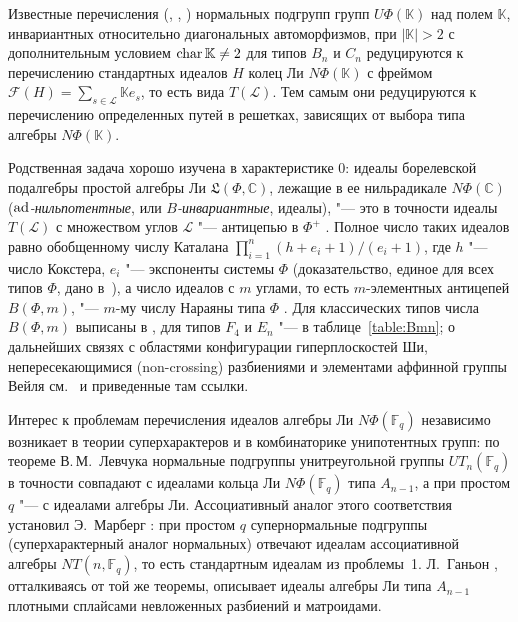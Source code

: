 \documentclass[a4paper,14pt,oneside,openany]{memoir}
\begin{document}
Известные перечисления (\cite[следствие 4.3]{vL74}, \cite[теорема
2.1.2]{Egorychev77}, \cite{Eg-Lev-1996}) нормальных подгрупп групп
$U\Phi(\mathbb{K})$ над полем $\mathbb{K}$, инвариантных относительно
диагональных автоморфизмов, при $|\mathbb{K}|>2$ с дополнительным условием
$\operatorname{char}\mathbb{K}\neq2$ для типов $B_n$ и $C_n$ редуцируются к перечислению
стандартных идеалов $H$ колец Ли $N\Phi(\mathbb{K})$ с фреймом $\mathcal{F}(H)
= \sum_{s\in \mathcal{L}} \mathbb{K}e_{s}$, то есть вида $T(\mathcal{L})$. Тем
самым они редуцируются к перечислению определенных путей в решетках, зависящих
от выбора типа алгебры $N\Phi(\mathbb{K})$.

Родственная задача хорошо изучена в характеристике $0$: идеалы борелевской
подалгебры простой алгебры Ли $\mathfrak{L}(\Phi, \mathbb{C})$, лежащие в ее
нильрадикале $N\Phi(\mathbb{C})$ (\emph{$\operatorname{ad}$-нильпотентные}, или
\emph{$B$-инвариантные}, идеалы), "--- это в точности идеалы $T(\mathcal{L})$ с
множеством углов $\mathcal{L}$ "--- антицепью в $\Phi^+$ \cite{cellini-papi-1}.
Полное число таких идеалов равно обобщенному числу Каталана $\prod_{i=1}^n (h +
e_i + 1)/(e_i + 1)$, где $h$ "--- число Кокстера, $e_i$ "--- экспоненты системы
$\Phi$ \cite[теорема~5.2]{fomin2007} (доказательство, единое для всех типов
$\Phi$, дано в~\cite[теорема~1]{cellini-papi-2}), а число идеалов с $m$ углами,
то есть $m$-элементных антицепей $B(\Phi, m)$, "--- $m$-му числу Нараяны типа
$\Phi$ \cite[теорема~5.9]{fomin2007}. Для классических типов числа $B(\Phi, m)$
выписаны в , для типов $F_4$ и $E_n$ "---
в таблице~\cref{table:Bmn}; о дальнейших связях с областями конфигурации
гиперплоскостей Ши, непересекающимися (non-crossing) разбиениями и элементами
аффинной группы Вейля см.~\cite{eS05,fomin2007} и приведенные там ссылки.

\medskip

Интерес к проблемам перечисления идеалов алгебры Ли $N\Phi(\mathbb{F}_q)$
независимо возникает в теории суперхарактеров и в комбинаторике унипотентных
групп: по теореме В.\,М.~Левчука \cite[теорема~1]{vL76} нормальные подгруппы
унитреугольной группы $UT_n(\mathbb{F}_q)$ в точности совпадают с идеалами
кольца Ли $N\Phi(\mathbb{F}_q)$ типа $A_{n-1}$, а при простом $q$ "--- с
идеалами алгебры Ли. Ассоциативный аналог этого соответствия установил
Э.~Марберг \cite{margberg2011}: при простом $q$ супернормальные подгруппы
(суперхарактерный аналог нормальных) отвечают идеалам ассоциативной алгебры
$NT(n,\mathbb{F}_q)$, то есть стандартным идеалам из проблемы~1. Л.~Ганьон
\cite{gagnon2021}, отталкиваясь от той же теоремы, описывает идеалы алгебры Ли
типа $A_{n-1}$ плотными сплайсами невложенных разбиений и матроидами.
\end{document}
